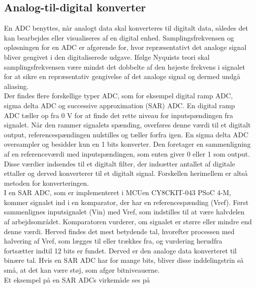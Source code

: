 \subsection{Analog-til-digital konverter}
En ADC benyttes, når analogt data skal konverteres til digitalt data, således det kan bearbejdes eller visualiseres af en digital enhed. Samplingsfrekvensen og opløsningen for en ADC er afgørende for, hvor repræsentativt det analoge signal bliver gengivet i den digitaliserede udgave. Ifølge Nyquists teori skal samplingsfrekvensen være mindst det dobbelte af den højeste frekvens i signalet for at sikre en repræsentativ gengivelse af det analoge signal og dermed undgå aliasing. \citep{Webster2011} \\
Der findes flere forskellige typer ADC, som for eksempel digital ramp ADC, sigma delta ADC og successive approximation (SAR) ADC. En digital ramp ADC tæller op fra 0 V for at finde det rette niveau for inputspændingen fra signalet. Når den rammer signalets spænding, overføres denne værdi til et digitalt output, referencespændingen nulstilles og tæller forfra igen. En sigma delta ADC oversampler og besidder kun en 1 bits konverter. Den foretager en sammenligning af en referenceværdi med inputspændingen, som enten giver 0 eller 1 som output. Disse værdier indsendes til et digitalt filter, der indsætter antallet af digitale ettaller og derved konverterer til et digitalt signal. Forskellen herimellem er altså metoden for konverteringen.~\citep{Moore2004,Sheingold2014} \\
I en SAR ADC, som er implementeret i MCUen CY8CKIT-043 PSoC 4-M, kommer signalet ind i en komparator, der har en referencespænding (Vref). Først sammenlignes inputsignalet (Vin) med Vref, som indstilles til at være halvdelen af arbejdsområdet. Komparatoren vurderer, om signalet er større eller mindre end denne værdi. Herved findes det mest betydende tal, hvorefter processen med halvering af Vref, som lægges til eller trækkes fra, og vurdering herudfra fortsætter indtil 12 bits er fundet. Derved er den analoge data konverteret til binære tal. Hvis en SAR ADC har for mange bits, bliver disse inddelingstrin så små, at det kan være støj, som afgør bitniveauerne. \citep{Moore2004,Sheingold2014} \\
Et eksempel på en SAR ADCs virkemåde ses på 
